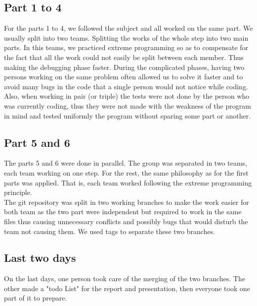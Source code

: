 \subsection{Part 1 to 4}

For the parts 1 to 4, we followed the subject and all worked on the same part.
We usually split into two teams.  Splitting the works of the whole step into
two main parts. In this teams, we practiced extreme programming so as to
compensate for the fact that all the work could not easily be split between
each member. Thus making the debugging phase faster. During the complicated
phases, having two persons working on the same problem often allowed us to
solve it faster and to avoid many bugs in the code that a single person would
not notice while coding.\\
Also, when working in pair (or triple) the tests were not done by the person
who was currently coding, thus they were not made with the weakness of the
program in mind and tested uniformly the program without sparing some part or
another.

\subsection{Part 5 and 6}

The parts 5 and 6 were done in parallel. The group was separated in two teams,
each team working on one step.  For the rest, the same philosophy as for the
first parts was applied. That is, each team worked following the extreme
programming principle.\\
The git repository was split in two working branches to make the work easier
for both team as the two part were independent but required to work in the same
files thus causing unnecessary conflicts and possibly bugs that would disturb
the team not causing them. We used tags to separate these two branches.

\subsection{Last two days}

On the last days, one person took care of the merging of the two branches. The
other made a "todo List" for the report and presentation, then everyone took
one part of it to prepare. 
